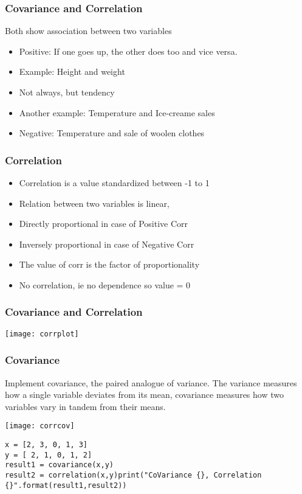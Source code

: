\begin{frame}[fragile]\frametitle{Covariance and Correlation}
Both show association between two variables
\begin{itemize}
\item Positive: If one goes up, the other does too and vice versa.
\item Example: Height and weight
\item Not always, but tendency
\item Another example: Temperature and Ice-creame sales
\item Negative: Temperature and sale of woolen clothes
\end{itemize}
\end{frame}

\begin{frame}[fragile]\frametitle{Correlation}
\begin{itemize}
\item Correlation is a value standardized between -1 to 1
\item Relation between two variables is linear, 
\item Directly proportional in case of Positive Corr
\item Inversely proportional in case of Negative Corr
\item The value of corr is the factor of proportionality
\item No correlation, ie no dependence so value = 0
\end{itemize}
\end{frame}

\begin{frame}[fragile]\frametitle{Covariance and Correlation}
\begin{center}
\texttt{[image: corrplot]}
\end{center}
\end{frame}

\begin{frame}[fragile]\frametitle{Covariance}
Implement covariance, the paired analogue of variance.
The variance measures how a single variable deviates from its mean, covariance measures how two variables vary in tandem from their means.
\begin{center}
\texttt{[image: corrcov]}
\end{center}
\begin{lstlisting}
x = [2, 3, 0, 1, 3]
y = [ 2, 1, 0, 1, 2]
result1 = covariance(x,y)
result2 = correlation(x,y)print("CoVariance {}, Correlation {}".format(result1,result2))
\end{lstlisting}
\end{frame}

